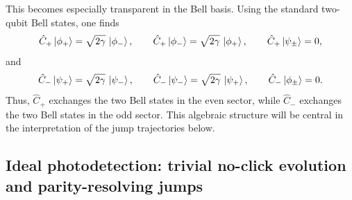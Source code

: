 This becomes especially transparent in the Bell basis. Using the standard two-qubit Bell states, one finds
\begin{equation}
	\hat C_+\ket{\phi_+}
	=
	\sqrt{2\gamma}\,\ket{\phi_-},
	\qquad
	\hat C_+\ket{\phi_-}
	=
	\sqrt{2\gamma}\,\ket{\phi_+},
	\qquad
	\hat C_+\ket{\psi_\pm}=0,
	\label{eq:N2_Cplus_Bell_action}
\end{equation}
and
\begin{equation}
	\hat C_-\ket{\psi_+}
	=
	\sqrt{2\gamma}\,\ket{\psi_-},
	\qquad
	\hat C_-\ket{\psi_-}
	=
	\sqrt{2\gamma}\,\ket{\psi_+},
	\qquad
	\hat C_-\ket{\phi_\pm}=0.
	\label{eq:N2_Cminus_Bell_action}
\end{equation}
Thus, \(\hat C_+\) exchanges the two Bell states in the even sector, while \(\hat C_-\) exchanges the two Bell states in the odd sector. This algebraic structure will be central in the interpretation of the jump trajectories below.
\subsection{Ideal photodetection: trivial no-click evolution and parity-resolving jumps}
\label{subsec:N2_ideal_photodetection}


